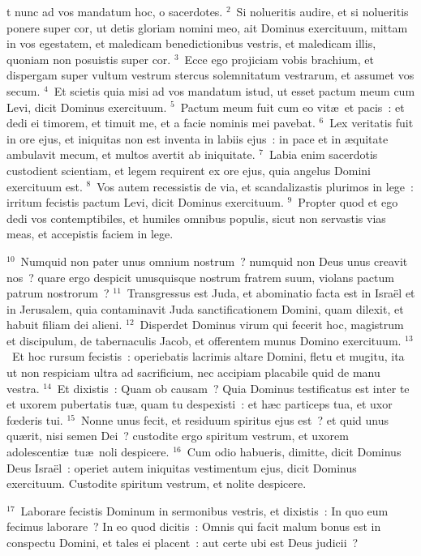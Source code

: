 \bchapter
{}t nunc ad vos mandatum hoc, o sacerdotes.
${}^{2}$~Si nolueritis audire, et si nolueritis ponere super cor, ut detis gloriam nomini meo, ait Dominus exercituum, mittam in vos egestatem, et maledicam benedictionibus vestris, et maledicam illis, quoniam non posuistis super cor.
${}^{3}$~Ecce ego projiciam vobis brachium, et dispergam super vultum vestrum stercus solemnitatum vestrarum, et assumet vos secum.
${}^{4}$~Et scietis quia misi ad vos mandatum istud, ut esset pactum meum cum Levi, dicit Dominus exercituum.
${}^{5}$~Pactum meum fuit cum eo vit\ae\ et pacis~: et dedi ei timorem, et timuit me, et a facie nominis mei pavebat.
${}^{6}$~Lex veritatis fuit in ore ejus, et iniquitas non est inventa in labiis ejus~: in pace et in \ae quitate ambulavit mecum, et multos avertit ab iniquitate.
${}^{7}$~Labia enim sacerdotis custodient scientiam, et legem requirent ex ore ejus, quia angelus Domini exercituum est.
${}^{8}$~Vos autem recessistis de via, et scandalizastis plurimos in lege~: irritum fecistis pactum Levi, dicit Dominus exercituum.
${}^{9}$~Propter quod et ego dedi vos contemptibiles, et humiles omnibus populis, sicut non servastis vias meas, et accepistis faciem in lege.


${}^{10}$~Numquid non pater unus omnium nostrum~? numquid non Deus unus creavit nos~? quare ergo despicit unusquisque nostrum fratrem suum, violans pactum patrum nostrorum~?
${}^{11}$~Transgressus est Juda, et abominatio facta est in Isra\"el et in Jerusalem, quia contaminavit Juda sanctificationem Domini, quam dilexit, et habuit filiam dei alieni.
${}^{12}$~Disperdet Dominus virum qui fecerit hoc, magistrum et discipulum, de tabernaculis Jacob, et offerentem munus Domino exercituum.
${}^{13}$~Et hoc rursum fecistis~: operiebatis lacrimis altare Domini, fletu et mugitu, ita ut non respiciam ultra ad sacrificium, nec accipiam placabile quid de manu vestra.
${}^{14}$~Et dixistis~: Quam ob causam~? Quia Dominus testificatus est inter te et uxorem pubertatis tu\ae , quam tu despexisti~: et h\ae c particeps tua, et uxor fœderis tui.
${}^{15}$~Nonne unus fecit, et residuum spiritus ejus est~? et quid unus qu\ae rit, nisi semen Dei~? custodite ergo spiritum vestrum, et uxorem adolescenti\ae\ tu\ae\ noli despicere.
${}^{16}$~Cum odio habueris, dimitte, dicit Dominus Deus Isra\"el~: operiet autem iniquitas vestimentum ejus, dicit Dominus exercituum. Custodite spiritum vestrum, et nolite despicere.


${}^{17}$~Laborare fecistis Dominum in sermonibus vestris, et dixistis~: In quo eum fecimus laborare~? In eo quod dicitis~: Omnis qui facit malum bonus est in conspectu Domini, et tales ei placent~: aut certe ubi est Deus judicii~?

